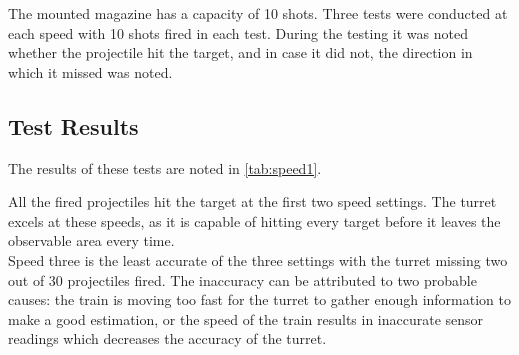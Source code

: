

The mounted magazine has a capacity of 10 shots. Three tests were conducted at each speed with 10 shots fired in each test. During the testing it was noted whether the projectile hit the target, and in case it did not, the direction in which it missed was noted.


\subsection{Test Results}\label{sec:turrettestresults}

The results of these tests are noted in \cref{tab:speed1}.


\smallskip
All the fired projectiles hit the target at the first two speed settings. The turret excels at these speeds, as it is capable of hitting every target before it leaves the observable area every time. \\


Speed three is the least accurate of the three settings with the turret missing two out of 30 projectiles fired. The inaccuracy can be attributed to two probable causes: the train is moving too fast for the turret to gather enough information to make a good estimation, or the speed of the train results in inaccurate sensor readings which decreases the accuracy of the turret.




